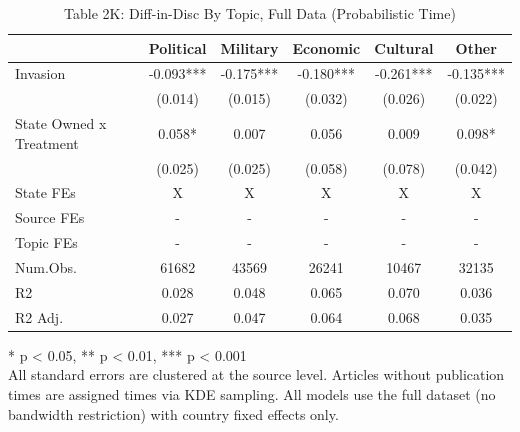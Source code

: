 \begin{table}[!t]
\caption{Table 2K: Diff-in-Disc By Topic, Full Data (Probabilistic Time)} 
\fontsize{12.0pt}{14.4pt}\selectfont
\begin{tabular*}{\linewidth}{@{\extracolsep{\fill}}lccccc}
\toprule
  & Political & Military & Economic & Cultural & Other \\ 
\midrule\addlinespace[2.5pt]
Invasion & -0.093*** & -0.175*** & -0.180*** & -0.261*** & -0.135*** \\ 
 & (0.014) & (0.015) & (0.032) & (0.026) & (0.022) \\ 
State Owned x Treatment & 0.058* & 0.007 & 0.056 & 0.009 & 0.098* \\ 
{} & {(0.025)} & {(0.025)} & {(0.058)} & {(0.078)} & {(0.042)} \\ 
State FEs & X & X & X & X & X \\ 
Source FEs & - & - & - & - & - \\ 
Topic FEs & - & - & - & - & - \\ 
Num.Obs. & 61682 & 43569 & 26241 & 10467 & 32135 \\ 
R2 & 0.028 & 0.048 & 0.065 & 0.070 & 0.036 \\ 
R2 Adj. & 0.027 & 0.047 & 0.064 & 0.068 & 0.035 \\ 
\bottomrule
\end{tabular*}
\begin{minipage}{\linewidth}
* p < 0.05, ** p < 0.01, *** p < 0.001\\
All standard errors are clustered at the source level. Articles without
publication times are assigned times via KDE sampling. All models use the full
dataset (no bandwidth restriction) with country fixed effects only.\\
\end{minipage}
\end{table}

